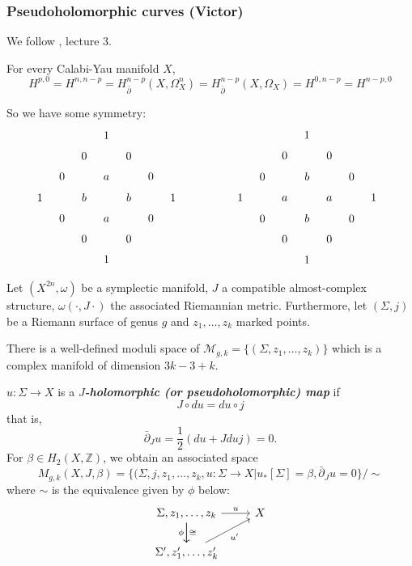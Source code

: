 \subsubsection{Pseudoholomorphic curves (Victor)}
We follow \cite{aroux}, lecture 3.
\begin{remark}
	For every Calabi-Yau manifold $X$,
	\[H^{p,0}= H^{n,n-p}=H^{n-p}_{\bar\partial}(X,\Omega^n_X)=H_{\bar\partial}^{n-p}(X,\Omega_X)=H^{0,n-p}=H^{n-p,0}\]
\end{remark}
So we have some symmetry:
\[\begin{tikzcd}[column sep=tiny,row sep=tiny]
	&&&1&&&&\\
	&&0&&0&&\\
	&0&&a&&0\\
	1&&b&&b&&1\\
	&0&&a&&0\\
	&&0&&0\\
	&&&1
\end{tikzcd}\qquad\qquad
\begin{tikzcd}[column sep=tiny,row sep=tiny]
	&&&1&&&&\\
	&&0&&0&&\\
	&0&&b&&0\\
	1&&a&&a&&1\\
	&0&&b&&0\\
	&&0&&0\\
	&&&1
\end{tikzcd}\]
\begin{defn}
	Let $(X^{2n},\omega)$ be a symplectic manifold, $J$ a compatible almost-complex structure, $\omega(\cdot,J\cdot)$ the associated Riemannian metric. Furthermore, let $(\Sigma, j)$ be a Riemann surface of genus $g$ and $z_1,\ldots,z_k$ marked points.

	There is a well-defined moduli space of $\mathcal{M}_{g,k}=\{(\Sigma,z_1,\ldots,z_k)\}$ which is a complex manifold of dimension $3k-3+k$.



	$u:\Sigma\to X$ is a \textbf{\textit{$J$-holomorphic (or pseudoholomorphic) map}} if
	\[J\circ du=du\circ j\]
	that is,
	\begin{equation}\label{eq:CR}
		\bar\partial_Ju=\frac{1}{2}(du+Jduj)=0.
	\end{equation}
	For $\beta\in H_2(X,\mathbb{Z})$, we obtain an associated space
	\[M_{g,k}(X,J,\beta)=\{(\Sigma,j,z_1,\ldots,z_k,u:\Sigma\to X|u_*[\Sigma]=\beta,\bar\partial_Ju=0\}/\sim\]
	where $\sim$ is the equivalence given by $\phi$ below:
	\[\begin{tikzcd}
		\Sigma,z_1,\ldots,z_k\arrow[r,"u"]\arrow[d,"\phi",swap]\arrow[d,"\cong"]&X\\
		\Sigma',z_1',\ldots,z_k'\arrow[ur,"u'",swap]
	\end{tikzcd}\]
\end{defn}
